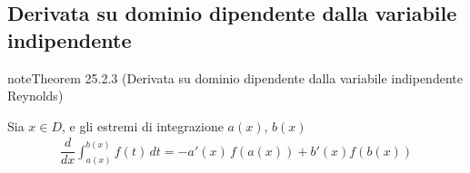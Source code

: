 \documentclass[letterpaper,10pt,italian]{jupyterBook}
\begin{document}
\subsection{Derivata su dominio dipendente dalla variabile indipendente}
\label{\detokenize{ch/infinitesimal_calculus/integrals:derivata-su-dominio-dipendente-dalla-variabile-indipendente}}\label{\detokenize{ch/infinitesimal_calculus/integrals:infinitesimal-calculus-integrals-thm-fund-reynolds}}\label{ch/infinitesimal_calculus/integrals:integrals:thm:fund:reynolds}
\begin{sphinxadmonition}{note}{Theorem 25.2.3 (Derivata su dominio dipendente dalla variabile indipendente \sphinxhyphen{} Reynolds)}



\sphinxAtStartPar
Sia \(x \in D\), e gli estremi di integrazione \(a(x)\), \(b(x)\)  
\begin{equation*}
\begin{split}\dfrac{d}{dx} \int_{a(x)}^{b(x)} f(t) \, dt = - a'(x) \, f(a(x)) + b'(x) f(b(x)) \end{split}
\end{equation*}\end{sphinxadmonition}
\end{document}
